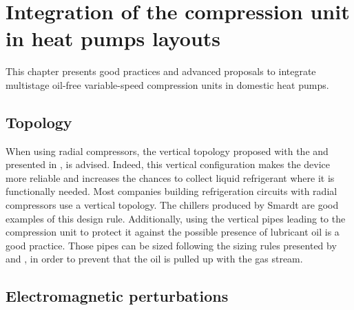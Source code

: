 \chapter{Integration of the compression unit
  in heat pumps layouts}
\label{chap:cp-intg}
\resetallacronyms

\begin{shaded}
  This chapter presents good practices and advanced proposals to
  integrate multistage oil-free variable-speed compression units in
  domestic heat pumps.
\end{shaded}

\section{Topology}
\label{sec:cp-intg-topology}

When using radial compressors, the vertical topology proposed with the
\BWP{} and presented in , is advised. Indeed,
this vertical configuration makes the device more reliable and
increases the chances to collect liquid refrigerant where it is
functionally needed. Most companies building refrigeration circuits
with radial compressors use a vertical topology. The chillers produced
by Smardt are good examples of this design
rule. Additionally, using the vertical pipes leading to the
compression unit to protect it against the possible presence of
lubricant oil is a good practice. Those pipes can be sized following
the sizing rules presented by \citet{kesim-ileri-2000a} and
\citet{Guo-Shen-2011a}, in order to prevent that the oil is pulled up
with the gas stream.

\section{Electromagnetic perturbations}
\label{sec:cp-intg-electromag}

